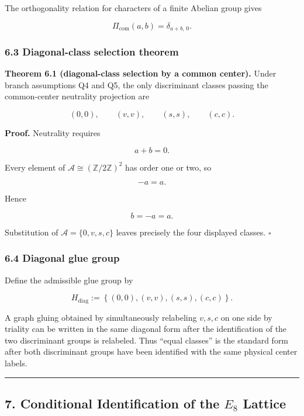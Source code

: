 \documentclass[
  a4paper,
]{article}
\begin{document}
The orthogonality relation for characters of a finite Abelian group
gives

\[
\Pi_{\mathrm{com}}(a,b)
=
\delta_{a+b,\,0}.
\]

\subsubsection{6.3 Diagonal-class selection
theorem}\label{diagonal-class-selection-theorem}

\textbf{Theorem 6.1 (diagonal-class selection by a common center).}
Under branch assumptions Q4 and Q5, the only discriminant classes
passing the common-center neutrality projection are

\[
\boxed{
(0,0),
\qquad
(v,v),
\qquad
(s,s),
\qquad
(c,c).
}
\]

\textbf{Proof.} Neutrality requires

\[
a+b=0.
\]

Every element of \(\mathcal A\cong(\mathbb Z/2\mathbb Z)^2\) has order
one or two, so

\[
-a=a.
\]

Hence

\[
b=-a=a.
\]

Substitution of \(\mathcal A=\{0,v,s,c\}\) leaves precisely the four
displayed classes. \(\square\)

\subsubsection{6.4 Diagonal glue group}\label{diagonal-glue-group}

Define the admissible glue group by

\[
H_{\mathrm{diag}}
:=
\left\{
(0,0),
(v,v),
(s,s),
(c,c)
\right\}.
\]

A graph gluing obtained by simultaneously relabeling \(v,s,c\) on one
side by triality can be written in the same diagonal form after the
identification of the two discriminant groups is relabeled. Thus ``equal
classes'' is the standard form after both discriminant groups have been
identified with the same physical center labels.

\begin{center}\rule{0.5\linewidth}{0.5pt}\end{center}

\subsection{\texorpdfstring{7. Conditional Identification of the \(E_8\)
Lattice}{7. Conditional Identification of the E\_8 Lattice}}\label{conditional-identification-of-the-e_8-lattice}
\end{document}
